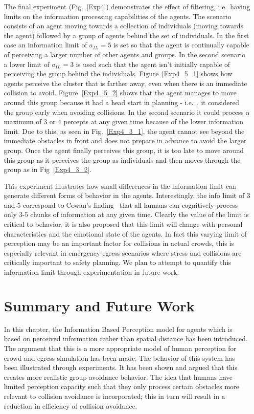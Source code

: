 The final experiment (Fig.~\ref{Exp4}) demonstrates the effect of filtering, i.e.\ having limits on the information processing capabilities of the agents. The scenario consists of an agent moving towards a collection of individuals (moving towards the agent) followed by a group of agents behind the set of individuals. In the first case an information limit of $a_{IL} = 5$ is set so that the agent is continually capable of perceiving a larger number of other agents and groups. In the second scenario a lower limit of $a_{IL} = 3$ is used such that the agent isn't initially capable of perceiving the group behind the individuals. Figure~\ref{Exp4_5_1} shows how agents perceive the cluster that is farther away, even when there is an immediate collision to avoid. Figure~\ref{Exp4_5_2} shows that the agent manages to move around this group because it had a head start in planning - i.e.\ , it considered the group early when avoiding collisions. In the second scenario it could process a maximum of 3 or 4 percepts at any given time because of the lower information limit. Due to this, as seen in Fig.~\ref{Exp4_3_1}, the agent cannot see beyond the immediate obstacles in front and does not prepare in advance to avoid the larger group. Once the agent finally perceives this group, it is too late to move around this group as it perceives the group as individuals and then moves through the group as in Fig~\ref{Exp4_3_2}.

This experiment illustrates how small differences in the information limit can generate different forms of behavior in the agents. Interestingly, the info limit of 3 and 5 correspond to Cowan's finding~\cite{Cowan:2001wi} that all humans can cognitively process only 3-5 chunks of information at any given time. Clearly the value of the limit is critical to behavior, it is also proposed that this limit will change with personal characteristics and the emotional state of the agents. In fact this varying limit of perception may be an important factor for collisions in actual crowds, this is especially relevant in emergency egress scenarios where stress and collisions are critically important to safety planning. We plan to attempt to quantify this information limit through experimentation in future work.

\section{Summary and Future Work}
\label{IBP:Conclusion}
In this chapter, the Information Based Perception model for agents which is based on perceived information rather than spatial distance has been introduced. The argument that this is a more appropriate model of human perception for crowd and egress simulation has been made. The behavior of this system has been illustrated through experiments. It has been shown and argued that this creates more realistic group avoidance behavior. The idea that humans have limited perception capacity such that they only process certain obstacles more relevant to collision avoidance is incorporated; this in turn will result in a reduction in efficiency of collision avoidance.


